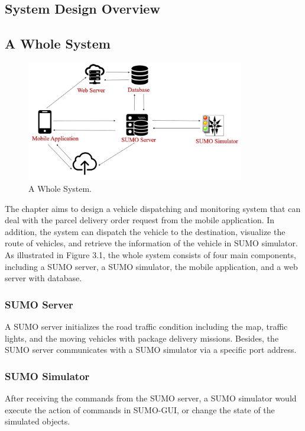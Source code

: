 \documentclass[12pt]{ksthesis}
\begin{document}
\begin{thesis}
{\chapter{System Design Overview}\label{Chap:Architecture}

\section{A Whole System}

\begin{figure}[t!]
\centering
\includegraphics[width=0.85\textwidth]{./Thesis_figures/F3-1_a_whole_system.PNG}
\caption{\large A Whole System.}
\vspace{0.5cm}
\label{Fig:A_Whole_System}
\end{figure}

The chapter aims to design a vehicle dispatching and monitoring system that can deal with the parcel delivery order request from the mobile application. In addition, the system can dispatch the vehicle to the destination, visualize the route of vehicles, and retrieve the information of the vehicle in SUMO simulator.
As illustrated in Figure 3.1, the whole system consists of four main components, including a SUMO server, a SUMO simulator, the mobile application, and a web server with database.

\subsection{SUMO Server}
A SUMO server initializes the road traffic condition including the map, traffic lights, and the moving vehicles with package delivery missions. Besides, the SUMO server communicates with a SUMO simulator via a specific port address.

\subsection{SUMO Simulator}
After receiving the commands from the SUMO server, a SUMO simulator would execute the action of commands in SUMO-GUI,  or change the state of the simulated objects.

}
\end{thesis}
\end{document}
